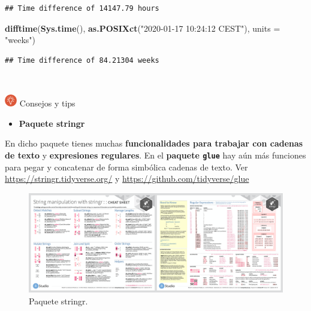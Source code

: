\documentclass[11pt,]{book}
\newenvironment{Shaded}{\begin{snugshade}}{\end{snugshade}}
\newcommand{\DataTypeTok}[1]{\textcolor[rgb]{0.27,0.27,0.27}{#1}}
\newcommand{\KeywordTok}[1]{\textcolor[rgb]{0.27,0.27,0.27}{\textbf{#1}}}
\newcommand{\NormalTok}[1]{#1}
\newcommand{\StringTok}[1]{\textcolor[rgb]{0.5,0.5,0.5}{#1}}
\providecommand{\tightlist}{%
  \setlength{\itemsep}{0pt}\setlength{\parskip}{0pt}}
\begin{document}
\begin{verbatim}
## Time difference of 14147.79 hours
\end{verbatim}

\begin{Shaded}
\begin{Highlighting}[]
\KeywordTok{difftime}\NormalTok{(}\KeywordTok{Sys.time}\NormalTok{(), }\KeywordTok{as.POSIXct}\NormalTok{(}\StringTok{"2020-01-17 10:24:12 CEST"}\NormalTok{), }\DataTypeTok{units =} \StringTok{"weeks"}\NormalTok{)}
\end{Highlighting}
\end{Shaded}

\begin{verbatim}
## Time difference of 84.21304 weeks
\end{verbatim}

~

\includegraphics[width=0.04\textwidth,height=\textheight]{img/logo_info.png} Consejos y tips

\begin{itemize}
\tightlist
\item
  \textbf{Paquete stringr}
\end{itemize}

En dicho paquete tienes muchas \textbf{funcionalidades para trabajar con cadenas de texto} y \textbf{expresiones regulares}. En el \textbf{paquete \texttt{glue}} hay aún más funciones para pegar y concatenar de forma simbólica cadenas de texto. Ver \url{https://stringr.tidyverse.org/} y \url{https://github.com/tidyverse/glue}

\begin{figure}

{\centering \includegraphics[width=0.95\linewidth]{./img/stringr} 

}

\caption{Paquete stringr.}\label{fig:stringr}
\end{figure}
\end{document}
